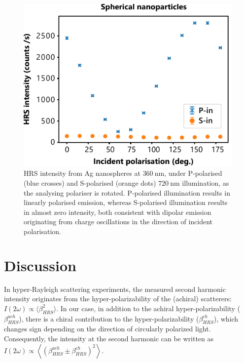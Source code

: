 \begin{figure}[htb!]	
    \centering	
    \includegraphics[scale=1.0]{./figures/results/HRS/hrs_spheres.pdf}
    \caption{\label{fig:results:HRS:hrs_spheres}
    HRS intensity from Ag nanospheres at $\SI{360}{\nano\m}$, under P-polarised (blue crosses) and S-polarised (orange dots) $\SI{720}{\nano\m}$ illumination, as the analysing polariser is rotated. P-polarised illumination results in linearly polarised emission, whereas S-polarised illumination results in almost zero intensity, both consistent with dipolar emission originating from charge oscillations in the direction of incident polarisation.}	
\end{figure}

\section{Discussion}

In hyper-Rayleigh scattering experiments, the measured second harmonic intensity originates from the hyper-polarizability of the (achiral) scatterers: $I(2\omega) \propto \langle \beta^{2}_{HRS} \rangle$.
In our case, in addition to the achiral hyper-polarizability ($\beta^{ach}_{HRS}$), there is a chiral contribution to the hyper-polarizability ($\beta^{ch}_{HRS}$), which changes sign depending on the direction of circularly polarized light. Consequently, the intensity at the second harmonic can be written as $I\left( {2\omega } \right) \propto \left\langle {{{\left( {\beta _{HRS}^{ach} \pm \beta _{HRS}^{ch}} \right)}^2}} \right\rangle$.

